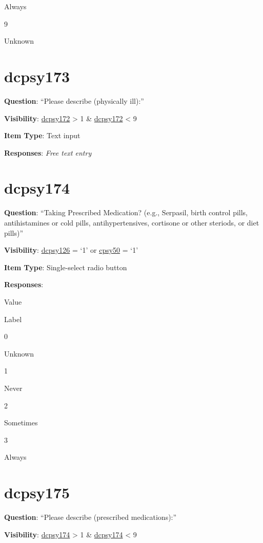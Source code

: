 \documentclass[]{book}
\begin{document}
Always

9

Unknown

\hypertarget{dcpsy173}{%
\section{dcpsy173}\label{dcpsy173}}

\textbf{Question}: ``Please describe (physically ill):''

\textbf{Visibility}: \protect\hyperlink{dcpsy172}{dcpsy172} \textgreater{} 1 \& \protect\hyperlink{dcpsy172}{dcpsy172} \textless{} 9

\textbf{Item Type}: Text input

\textbf{Responses}: \emph{Free text entry}

\hypertarget{dcpsy174}{%
\section{dcpsy174}\label{dcpsy174}}

\textbf{Question}: ``Taking Prescribed Medication? (e.g., Serpasil, birth control pills, antihistamines or cold pills, antihypertensives, cortisone or other steriods, or diet pills)''

\textbf{Visibility}: \protect\hyperlink{dcpsy126}{dcpsy126} = `1' or \protect\hyperlink{cpsy50}{cpsy50} = `1'

\textbf{Item Type}: Single-select radio button

\textbf{Responses}:

Value

Label

0

Unknown

1

Never

2

Sometimes

3

Always

\hypertarget{dcpsy175}{%
\section{dcpsy175}\label{dcpsy175}}

\textbf{Question}: ``Please describe (prescribed medications):''

\textbf{Visibility}: \protect\hyperlink{dcpsy174}{dcpsy174} \textgreater{} 1 \& \protect\hyperlink{dcpsy174}{dcpsy174} \textless{} 9
\end{document}
